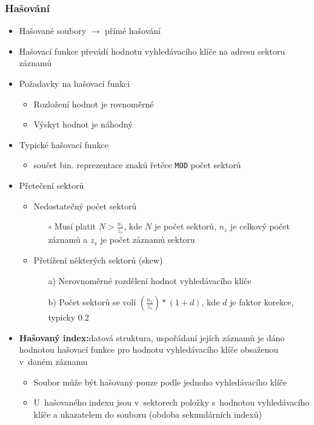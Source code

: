 \documentclass[a4paper,10pt]{article}
\newcommand{\pojem}[2]{\item \textbf{#1:}\quad #2}
\begin{document}
      \subsubsection{Hašování}
        \begin{itemize}
          \item Hašované soubory $\rightarrow$ přímé hašování
          \item Hašovací funkce převádí hodnotu vyhledávacího klíče na adresu sektoru záznamů

          \item Požadavky na hašovací funkci
          \begin{itemize}
            \item Rozložení hodnot je rovnoměrné
            \item Výskyt hodnot je náhodný
          \end{itemize}

          \item Typické hašovací funkce
          \begin{itemize}
            \item součet bin. reprezentace znaků řetěce \texttt{MOD} počet sektorů
          \end{itemize}

          \item Přetečení sektorů
          \begin{itemize}
            \item Nedostatečný počet sektorů
            \begin{itemize}
              \item[$\circ$] Musí platit $N > \frac{n_z}{z_s}$, kde $N$ je počet sektorů, $n_z$ je celkový počet záznamů a $z_s$ je počet záznamů sektoru
            \end{itemize}
            \item Přetížení některých sektorů (skew)
            \begin{itemize}
              \item[a)] Nerovnoměrné rozdělení hodnot vyhledávacího klíče
              \item[b)] Počet sektorů se volí $\left(\frac{n_z}{z_s}\right)*(1+d)$, kde $d$ je faktor korekce, typicky 0.2
            \end{itemize}
          \end{itemize}

          \pojem{Hašovaný index}{datová struktura, uspořádaní jejích záznamů je dáno hodnotou hašovací funkce pro hodnotu vyhledávacího klíče obsaženou v~daném záznamu}
          \begin{itemize}
            \item Soubor může být hašovaný pouze podle jednoho vyhledávacího klíče
            \item U~hašovaného indexu jsou v~sektorech položky s~hodnotou vyhledávacího klíče a ukazatelem do souboru (obdoba sekundárních indexů)
          \end{itemize}


\end{itemize}
\end{document}
